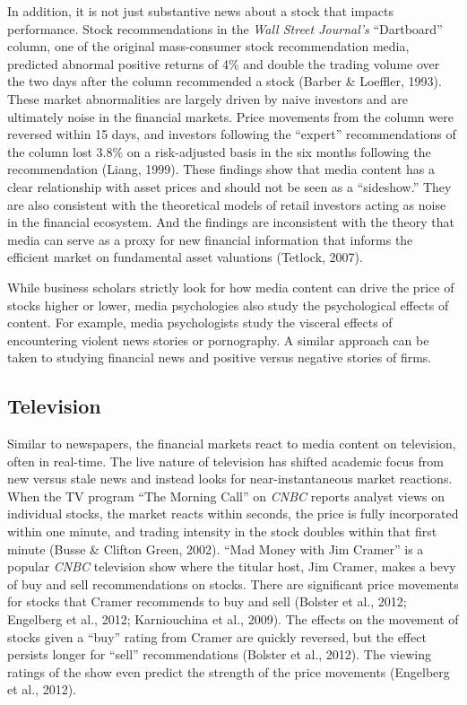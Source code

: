 \documentclass[12pt,]{article}
\begin{document}
In addition, it is not just substantive news about a stock that impacts
performance. Stock recommendations in the \emph{Wall Street Journal's}
``Dartboard'' column, one of the original mass-consumer stock
recommendation media, predicted abnormal positive returns of 4\% and
double the trading volume over the two days after the column recommended
a stock (Barber \& Loeffler, 1993). These market abnormalities are
largely driven by naive investors and are ultimately noise in the
financial markets. Price movements from the column were reversed within
15 days, and investors following the ``expert'' recommendations of the
column lost 3.8\% on a risk-adjusted basis in the six months following
the recommendation (Liang, 1999). These findings show that media content
has a clear relationship with asset prices and should not be seen as a
``sideshow.'' They are also consistent with the theoretical models of
retail investors acting as noise in the financial ecosystem. And the
findings are inconsistent with the theory that media can serve as a
proxy for new financial information that informs the efficient market on
fundamental asset valuations (Tetlock, 2007).

While business scholars strictly look for how media content can drive
the price of stocks higher or lower, media psychologies also study the
psychological effects of content. For example, media psychologists study
the visceral effects of encountering violent news stories or
pornography. A similar approach can be taken to studying financial news
and positive versus negative stories of firms.

\hypertarget{television}{%
\subsection{Television}\label{television}}

Similar to newspapers, the financial markets react to media content on
television, often in real-time. The live nature of television has
shifted academic focus from new versus stale news and instead looks for
near-instantaneous market reactions. When the TV program ``The Morning
Call'' on \emph{CNBC} reports analyst views on individual stocks, the
market reacts within seconds, the price is fully incorporated within one
minute, and trading intensity in the stock doubles within that first
minute (Busse \& Clifton Green, 2002). ``Mad Money with Jim Cramer'' is
a popular \emph{CNBC} television show where the titular host, Jim
Cramer, makes a bevy of buy and sell recommendations on stocks. There
are significant price movements for stocks that Cramer recommends to buy
and sell (Bolster et al., 2012; Engelberg et al., 2012; Karniouchina et
al., 2009). The effects on the movement of stocks given a ``buy'' rating
from Cramer are quickly reversed, but the effect persists longer for
``sell'' recommendations (Bolster et al., 2012). The viewing ratings of
the show even predict the strength of the price movements (Engelberg et
al., 2012).
\end{document}
